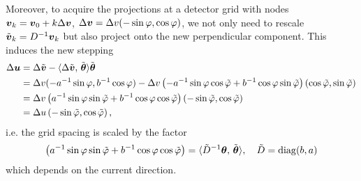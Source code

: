 \documentclass{amsart}
\newcommand*{\Dinv}{{\ensuremath{D^{-1}}}}
\renewcommand*{\phi}{\varphi}
\begin{document}
Moreover, to acquire the projections at a detector grid with nodes 
${\boldsymbol{v}}_k = {\boldsymbol{v}}_0 + k\Delta{\boldsymbol{v}}$, $\Delta \Bv = \Delta v (-\sin\phi, \cos\phi)$, we not only need to rescale $\tilde \Bv_k = \Dinv\Bv_k$ but 
also project onto the new perpendicular component. This induces the new stepping 
%
\begin{align*}
 \Delta\Bu 
 &= \Delta\tilde\Bv - \spr{\Delta\tilde\Bv}{\tilde\Btheta}\tilde\Btheta \\
 &= \Delta v (-a^{-1}\sin\phi, b^{-1}\cos\phi) - \Delta v \left(-a^{-1}\sin\phi \cos\tilde\phi + b^{-1}\cos\phi \sin\tilde\phi\right) 
 \left(\cos\tilde\phi,  \sin\tilde\phi\right) \\
 &= \Delta v \left(a^{-1} \sin\phi \sin\tilde\phi + b^{-1} \cos\phi \cos\tilde\phi \right) \left(-\sin\tilde\phi, \cos\tilde\phi\right) \\
 &= \Delta u \left(-\sin\tilde\phi, \cos\tilde\phi\right),
\end{align*}
%
i.e. the grid spacing is scaled by the factor
%
\begin{equation*}
 \left(a^{-1} \sin\phi \sin\tilde\phi + b^{-1} \cos\phi \cos\tilde\phi \right) = \spr{\tilde D^{-1} \Btheta}{\tilde\Btheta}, \quad 
 \tilde D = \DIAG(b, a)
\end{equation*}
%
which depends on the current direction.
\end{document}
